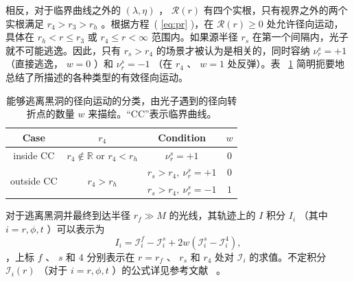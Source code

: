 \documentclass[aps,reprint,superscriptaddress,nofootinbib,floatfix,longbibliography,preprintnumbers]{revtex4-1}
\newcommand{\I}{\mathcal{I}}
\begin{document}
相反，对于临界曲线之外的    $(\lambda, \eta)$   ，   $\mathcal{R}(r)$    有四个实根，只有视界之外的两个实根满足    $r_4 > r_3 > r_h$    。根据方程~(    \ref{eq:pr}    )，在    $\mathcal{R}(r) \geq 0$    处允许径向运动，具体在    $r_h < r \leq r_3$    或    $r_4 \leq r < \infty$    范围内。如果源半径    $r_s$    在第一个间隔内，光子就不可能逃逸。因此，只有    $r_s > r_4$    的场景才被认为是相关的，同时容纳    $\nu_r^s = +1$   （直接逃逸，   $w = 0$    ）和    $\nu_r^s = -1$   （在    $r_4$    、    $w = 1$    处反弹）。表~    \ref{tab:radial types}    简明扼要地总结了所描述的各种类型的有效径向运动。  

   \begin{table}[!htbp]
    \renewcommand\arraystretch{1.3} 
    \setlength\tabcolsep{4pt} 
    \begin{tabular}{cccc}\hline\hline
       Case &         $r_4$         & Condition &         $w$          \\  \hline
        inside CC &         $r_4\notin\mathbb{R}$         or         $r_4<r_h$         &         $\nu_r^s=+1$          &         $0$          \\  
       \multirow{2}{*}{outside CC} &  \multirow{2}{*}{        $r_4>r_h$        } &         $r_s>r_4, \  \nu_r^s=+1$         &         $0$          \\  
        & &         $r_s>r_4, \  \nu_r^s=-1$         &         $1$         \\  \hline
    \end{tabular}
\caption{能够逃离黑洞的径向运动的分类，由光子遇到的径向转折点的数量    $w$    来描绘。“CC”表示临界曲线。  }
    \label{tab:radial types}
    \end{table}     

对于逃离黑洞并最终到达半径    $r_f \gg M$    的光线，其轨迹上的    $I$    积分    $I_i$   （其中    $i=r,\phi,t$    ）可以表示为
   \begin{equation}
        I_i=\I_i^f-\I_i^s+2w\left(\I_i^s-\I_i^4\right),
    \label{eq:radial int}
    \end{equation}    ，上标    $f$    、    $s$    和    $4$    分别表示在    $r=r_f$    、    $r_s$    和    $r_4$    处对    $\I_i$    的求值。不定积分    $\I_i(r)$   （对于    $i=r,\phi,t$    ）的公式详见参考文献~    \cite{Gralla:2019ceu}    。
\end{document}
